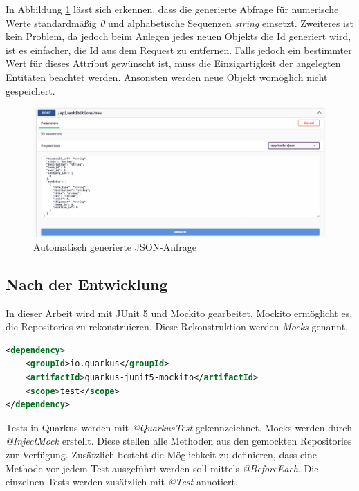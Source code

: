 In Abbildung \ref{fig:implementation:swaggeruipost} lässt sich erkennen, dass die generierte Abfrage für numerische Werte standardmäßig \emph{0} und alphabetische Sequenzen \emph{string} einsetzt. 
Zweiteres ist kein Problem, da jedoch beim Anlegen jedes neuen Objekts die Id generiert wird, ist es einfacher, die Id aus dem Request zu entfernen. 
Falls jedoch ein bestimmter Wert für dieses Attribut gewünscht ist, muss die Einzigartigkeit der angelegten Entitäten beachtet werden. 
Ansonsten werden neue Objekt womöglich nicht gespeichert.

\begin{figure}
    \centering
    \includegraphics[scale=0.3]{pics/swaggeruipost.png}
    \caption{Automatisch generierte JSON-Anfrage}
    \label{fig:implementation:swaggeruipost}
\end{figure}

\subsection{Nach der Entwicklung}

In dieser Arbeit wird mit JUnit 5 und Mockito gearbeitet. 
Mockito ermöglicht es, die Repositories zu rekonstruieren. 
Diese Rekonstruktion werden \emph{Mocks} genannt.
\cite{quarkusMockAbout}
\begin{lstlisting}[label=JUnit 5 Abhängigkeit in pom.xml, language=xml]
<dependency>
    <groupId>io.quarkus</groupId>
    <artifactId>quarkus-junit5-mockito</artifactId>
    <scope>test</scope>
</dependency>
\end{lstlisting}

Tests in Quarkus werden mit \emph{@QuarkusTest} gekennzeichnet. 
Mocks werden durch \emph{@InjectMock} erstellt.
Diese stellen alle Methoden aus den gemockten Repositories zur Verfügung.
Zusätzlich besteht die Möglichkeit zu definieren, dass eine Methode vor jedem Test ausgeführt werden soll mittels \emph{@BeforeEach}. 
Die einzelnen Tests werden zusätzlich mit \emph{@Test} annotiert. 
\cite{quarkusMockAbout}

